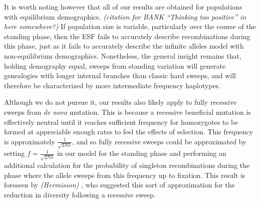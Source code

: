 \documentclass[a4paper,10pt]{article}
\newcommand{\jb}[1]{{\it\color{blue} (#1)} }
\begin{document}
It is worth noting however that all of our results are obtained for populations with equilibrium demographics. \jb{citation for BANK ``Thinking too positive'' in here somewhere?} If population size is variable, particularly over the course of the standing phase, then the ESF fails to accurately describe recombinations during this phase, just as it fails to accurately describe the infinite alleles model with non-equilibrium demographics. Nonetheless, the general insight remains that, holding demography equal, sweeps from standing variation will generate genealogies with longer internal branches than classic hard sweeps, and will therefore be characterized by more intermediate frequency haplotypes. 


Although we do not pursue it, our results also likely apply to fully recessive sweeps from \textit{de novo} mutation. This is because a recessive beneficial mutation is effectively neutral until it reaches sufficient frequency for homozygotes to be formed at appreciable enough rates to feel the effects of selection. This frequency is approximately $\frac{1}{\sqrt{2Ns}}$, and so fully recessive sweeps could be approximated by setting $f = \frac{1}{\sqrt{2Ns}}$ in our model for the standing phase and performing an additional calculation for the probability of singleton recombinations during the phase where the allele sweeps from this frequency up to fixation. This result is foreseen by \jb{Hermisson}, who suggested this sort of approximation for the reduction in diversity following a recessive sweep.
\end{document}
